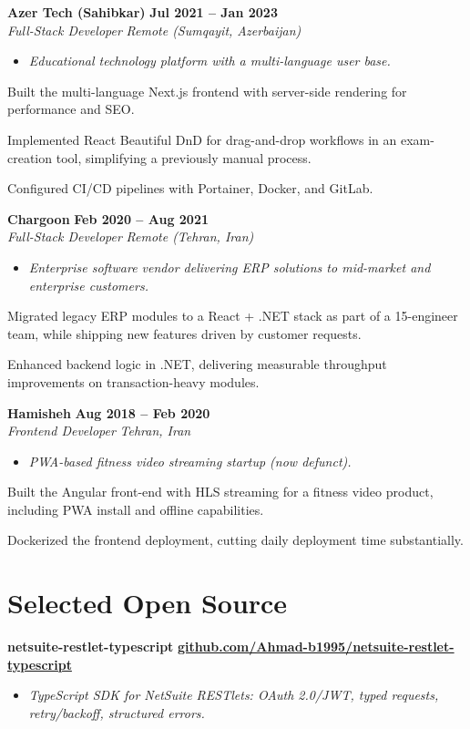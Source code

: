 \documentclass[letterpaper,10pt]{article}
\newcommand{\heading}[2]{
  \hspace{10pt}#1\hfill#2\\
}
\newcommand{\headingBf}[2]{
  \heading{\textbf{#1}}{\textbf{#2}}
}
\newcommand{\headingIt}[2]{
  \heading{\textit{#1}}{\textit{#2}}
}
\newenvironment{resume_list}{
  \vspace{-7pt}
  \begin{itemize}[itemsep=-2px, parsep=1pt, leftmargin=30pt]
}{
  \end{itemize}
  \vspace{1pt}
}
\newcommand{\companyDescription}[1]{
  \vspace{-7pt}
  \begin{itemize}[itemsep=-2px, parsep=1pt, leftmargin=12pt]
    \item[] {\color{textMuted}\textit{#1}}
  \end{itemize}
  \vspace{-4pt}
}
\begin{document}
  \headingBf{ Azer Tech (Sahibkar) }{ Jul 2021 -- Jan 2023 }
  \headingIt{ Full-Stack Developer }{ Remote (Sumqayit, Azerbaijan) }
  \companyDescription{ Educational technology platform with a multi-language user base. }
  \begin{resume_list}
    \item Built the multi-language Next.js frontend with server-side rendering for performance and SEO.
    \item Implemented React Beautiful DnD for drag-and-drop workflows in an exam-creation tool, simplifying a previously manual process.
    \item Configured CI/CD pipelines with Portainer, Docker, and GitLab.
  \end{resume_list}

  \headingBf{ Chargoon }{ Feb 2020 -- Aug 2021 }
  \headingIt{ Full-Stack Developer }{ Remote (Tehran, Iran) }
  \companyDescription{ Enterprise software vendor delivering ERP solutions to mid-market and enterprise customers. }
  \begin{resume_list}
    \item Migrated legacy ERP modules to a React + .NET stack as part of a 15-engineer team, while shipping new features driven by customer requests.
    \item Enhanced backend logic in .NET, delivering measurable throughput improvements on transaction-heavy modules.
  \end{resume_list}

  \headingBf{ Hamisheh }{ Aug 2018 -- Feb 2020 }
  \headingIt{ Frontend Developer }{ Tehran, Iran }
  \companyDescription{ PWA-based fitness video streaming startup (now defunct). }
  \begin{resume_list}
    \item Built the Angular front-end with HLS streaming for a fitness video product, including PWA install and offline capabilities.
    \item Dockerized the frontend deployment, cutting daily deployment time substantially.
  \end{resume_list}

  \section{Selected Open Source}

  \headingBf{ netsuite-restlet-typescript }{ \href{https://github.com/Ahmad-b1995/netsuite-restlet-typescript}{github.com/Ahmad-b1995/netsuite-restlet-typescript} }
  \companyDescription{ TypeScript SDK for NetSuite RESTlets: OAuth 2.0/JWT, typed requests, retry/backoff, structured errors. }
\end{document}
